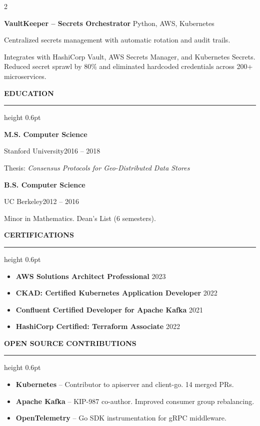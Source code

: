 \documentclass[11pt,a4paper]{article}
\newcommand{\tsection}[1]{%
  \vspace{6pt}
  {\large\bfseries\color{terminalDark}#1}
  \vspace{2pt}
  \hrule height 0.6pt
  \vspace{4pt}
}
\newcommand{\projectentry}[4]{%
  \vspace{2pt}
  {\bfseries\color{terminalDark}#1} \hfill {\color{terminalGray}\footnotesize#2}\par
  {\color{terminalCyan}\footnotesize#3}\par
  \vspace{1pt}
  #4\par
}
\begin{document}
\begin{paracol}{2}
\vspace{4pt}

\projectentry{VaultKeeper -- Secrets Orchestrator}{Python, AWS, Kubernetes}{%
  Centralized secrets management with automatic rotation and audit trails.
}{%
  Integrates with HashiCorp Vault, AWS Secrets Manager, and Kubernetes Secrets. Reduced secret sprawl by 80\% and eliminated hardcoded credentials across 200+ microservices.
}

\tsection{EDUCATION}

\vspace{3pt}
{\bfseries\color{terminalDark}M.S. Computer Science}\par
{\color{terminalGreen}Stanford University}\hfill{\color{terminalGray}\footnotesize 2016 -- 2018}\par
\vspace{1pt}
Thesis: \textit{Consensus Protocols for Geo-Distributed Data Stores}\par
\vspace{4pt}

{\bfseries\color{terminalDark}B.S. Computer Science}\par
{\color{terminalGreen}UC Berkeley}\hfill{\color{terminalGray}\footnotesize 2012 -- 2016}\par
\vspace{1pt}
Minor in Mathematics. Dean's List (6 semesters).

\tsection{CERTIFICATIONS}

\vspace{3pt}
\begin{itemize}[leftmargin=*,nosep,itemsep=1pt]
  \item {\color{terminalDark}\textbf{AWS Solutions Architect Professional}} \hfill {\color{terminalGray}\footnotesize 2023}
  \item {\color{terminalDark}\textbf{CKAD: Certified Kubernetes Application Developer}} \hfill {\color{terminalGray}\footnotesize 2022}
  \item {\color{terminalDark}\textbf{Confluent Certified Developer for Apache Kafka}} \hfill {\color{terminalGray}\footnotesize 2021}
  \item {\color{terminalDark}\textbf{HashiCorp Certified: Terraform Associate}} \hfill {\color{terminalGray}\footnotesize 2022}
\end{itemize}

\tsection{OPEN SOURCE CONTRIBUTIONS}

\vspace{3pt}
\begin{itemize}[leftmargin=*,nosep,itemsep=1pt]
  \item {\color{terminalDark}\textbf{Kubernetes}} -- Contributor to apiserver and client-go. 14 merged PRs.
  \item {\color{terminalDark}\textbf{Apache Kafka}} -- KIP-987 co-author. Improved consumer group rebalancing.
  \item {\color{terminalDark}\textbf{OpenTelemetry}} -- Go SDK instrumentation for gRPC middleware.
\end{itemize}


\end{paracol}
\end{document}
